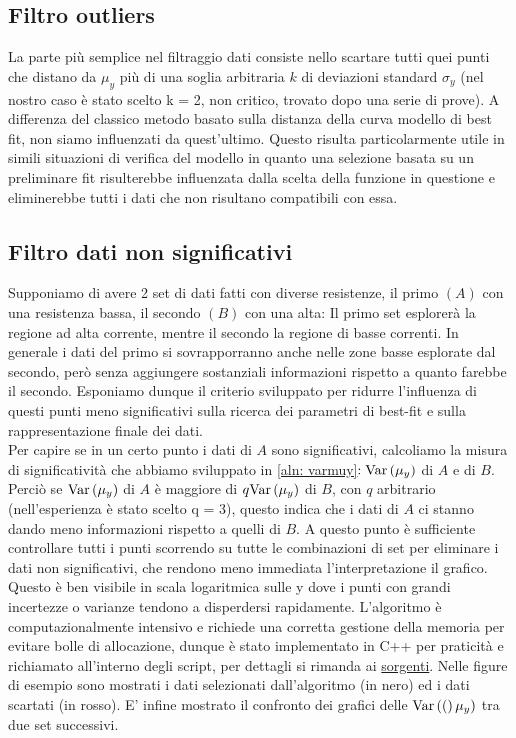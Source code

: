 \documentclass{article}[a4paper, oneside, 11pt]
\begin{document}
\subsection{Filtro outliers}
La parte più semplice nel filtraggio dati consiste nello scartare tutti quei
punti che distano da $\mu_y$ più di una soglia arbitraria $k$ di deviazioni
standard $\sigma_y$ (nel nostro caso è stato scelto k = 2, non critico,
trovato dopo una serie di prove). A differenza del classico metodo basato
sulla distanza della curva modello di best fit, non siamo influenzati da
quest’ultimo. Questo risulta particolarmente utile in simili situazioni di
verifica del modello in quanto una selezione basata su un preliminare fit
risulterebbe influenzata dalla scelta della funzione in questione e
eliminerebbe tutti i dati che non risultano compatibili con essa.

\subsection{Filtro dati non significativi}
Supponiamo di avere 2 set di dati fatti con diverse resistenze, il primo $(A)$
con una resistenza bassa, il secondo $(B)$ con una alta: Il primo set esplorerà
la regione ad alta corrente, mentre il secondo la regione di basse correnti.
In generale i dati del primo si sovrapporranno anche nelle zone basse esplorate
dal secondo, però senza aggiungere sostanziali informazioni rispetto a quanto
farebbe il secondo.
Esponiamo dunque il criterio sviluppato per ridurre l'influenza di questi
punti meno significativi sulla ricerca dei parametri di best-fit e sulla
rappresentazione finale dei dati.\\
Per capire se in un certo punto i dati di $A$ sono significativi, calcoliamo
la misura di significatività che abbiamo sviluppato in \eqref{aln: varmuy}$:
\text{Var}\left(\mu_y\right)$ di $A$ e di $B$. Perciò se $\text{Var}\left(\mu_y\right)$ di $A$ è maggiore di 
$q\text{Var}\left(\mu_y\right)$ di $B$, con $q$ arbitrario (nell’esperienza è stato scelto
q = 3), questo indica che i dati di $A$
ci stanno dando meno informazioni rispetto a quelli di $B$. A questo punto
è sufficiente controllare tutti i punti scorrendo su tutte le combinazioni
di set per eliminare i dati non significativi, che rendono meno
immediata l'interpretazione il grafico. Questo è ben visibile in scala
logaritmica sulle y dove i punti con grandi incertezze o varianze tendono
a disperdersi rapidamente.
L’algoritmo è computazionalmente intensivo e richiede una corretta gestione
della memoria per evitare bolle di allocazione, dunque è stato implementato
in C++ per praticità e richiamato all’interno degli script, per dettagli si rimanda ai \href{https://github.com/LucaCiucci/relaz_seme/tree/master/Cartella_fit/filter_src}{sorgenti}.
Nelle figure di esempio sono mostrati i dati selezionati dall’algoritmo
(in nero) ed i dati scartati (in rosso). 
E’ infine mostrato il confronto dei grafici delle $\text{Var}\left((\right)\mu_y)$
tra due set successivi.
\end{document}
